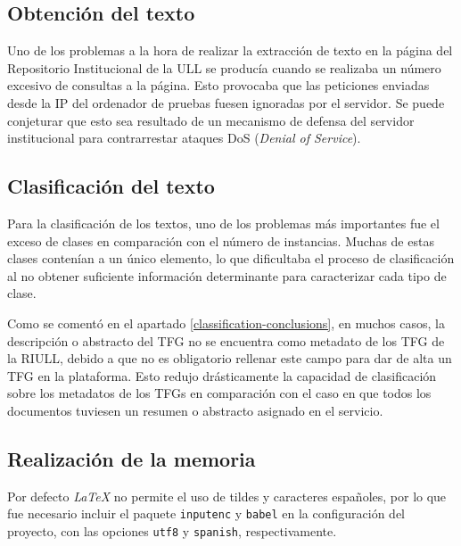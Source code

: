 \lhead{\emph{\ChapterThree{}}}
\subsection{Obtención del texto}

Uno de los problemas a la hora de realizar la extracción de texto en la página del Repositorio Institucional de la ULL se producía cuando se realizaba un número excesivo de consultas a la página. Esto provocaba que las peticiones enviadas desde la IP del ordenador de pruebas fuesen ignoradas por el servidor. Se puede conjeturar que esto sea resultado de un mecanismo de defensa del servidor institucional para contrarrestar ataques DoS (\textit{Denial of Service}). 

\subsection{Clasificación del texto}

Para la clasificación de los textos, uno de los problemas más importantes fue el exceso de clases en comparación con el número de instancias. Muchas de estas clases contenían a un único elemento, lo que dificultaba el proceso de clasificación al no obtener suficiente información determinante para caracterizar cada tipo de clase.

Como se comentó en el apartado \ref{classification-conclusions}, en muchos casos, la descripción o abstracto del TFG no se encuentra como metadato de los TFG de la RIULL, debido a que no es obligatorio rellenar este campo para dar de alta un TFG en la plataforma.
%
Esto redujo drásticamente la capacidad de clasificación sobre los metadatos de los TFGs en comparación con el caso en que todos los documentos tuviesen un resumen o abstracto asignado en el servicio.

\subsection{Realización de la memoria}

Por defecto \textit{LaTeX} no permite el uso de tildes y caracteres españoles, por lo que fue necesario incluir el paquete \texttt{inputenc} y \texttt{babel} en la configuración del proyecto, con las opciones \texttt{utf8} y \texttt{spanish}, respectivamente.

